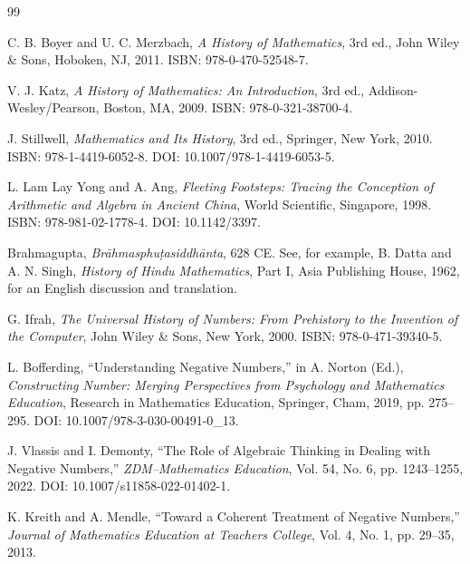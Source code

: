\documentclass[11pt]{article}
\begin{document}
\begin{thebibliography}{99}

C. B. Boyer and U. C. Merzbach,
\textit{A History of Mathematics},
3rd ed.,
John Wiley \& Sons, Hoboken, NJ, 2011.
ISBN: 978-0-470-52548-7.

V. J. Katz,
\textit{A History of Mathematics: An Introduction},
3rd ed.,
Addison-Wesley/Pearson, Boston, MA, 2009.
ISBN: 978-0-321-38700-4.

J. Stillwell,
\textit{Mathematics and Its History},
3rd ed.,
Springer, New York, 2010.
ISBN: 978-1-4419-6052-8.
DOI: 10.1007/978-1-4419-6053-5.

L. Lam Lay Yong and A. Ang,
\textit{Fleeting Footsteps: Tracing the Conception of Arithmetic and Algebra in Ancient China},
World Scientific, Singapore, 1998.
ISBN: 978-981-02-1778-4.
DOI: 10.1142/3397.

Brahmagupta,
\textit{Brāhmasphuṭasiddhānta},
628 CE.
See, for example, B. Datta and A. N. Singh,
\textit{History of Hindu Mathematics},
Part I, Asia Publishing House, 1962,
for an English discussion and translation.

G. Ifrah,
\textit{The Universal History of Numbers: From Prehistory to the Invention of the Computer},
John Wiley \& Sons, New York, 2000.
ISBN: 978-0-471-39340-5.

L. Bofferding,
``Understanding Negative Numbers,''
in A. Norton (Ed.),
\textit{Constructing Number: Merging Perspectives from Psychology and Mathematics Education},
Research in Mathematics Education,
Springer, Cham, 2019,
pp. 275--295.
DOI: 10.1007/978-3-030-00491-0\_13.

J. Vlassis and I. Demonty,
``The Role of Algebraic Thinking in Dealing with Negative Numbers,''
\textit{ZDM--Mathematics Education},
Vol. 54, No. 6, pp. 1243--1255, 2022.
DOI: 10.1007/s11858-022-01402-1.

K. Kreith and A. Mendle,
``Toward a Coherent Treatment of Negative Numbers,''
\textit{Journal of Mathematics Education at Teachers College},
Vol. 4, No. 1, pp. 29--35, 2013.

\end{thebibliography}
\end{document}
